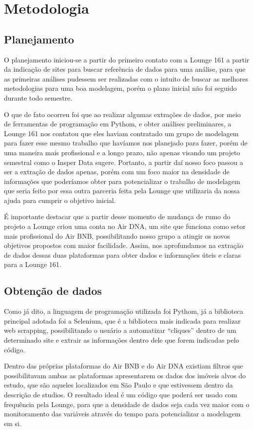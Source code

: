 \section*{Metodologia}
\subsection*{Planejamento} 
O planejamento iniciou-se a partir do primeiro contato com a Lounge 
161 a partir da indicação de sites para buscar referência de dados para uma 
análise, para que as primeiras análises pudessem ser realizadas com o intuito 
de buscar as melhores metodologias para uma boa modelagem, porém o 
plano inicial não foi seguido durante todo semestre. 

O que de fato ocorreu foi que ao realizar algumas extrações de dados, 
por meio de ferramentas de programação em Pythom, e obter análises 
preliminares, a Lounge 161 nos contatou que eles haviam contratado um 
grupo de modelagem para fazer esse mesmo trabalho que havíamos nos 
planejado para fazer, porém de uma maneira mais profissional e a longo 
prazo, não apenas visando um projeto semestral como o Insper Data sugere.
Portanto, a partir daí nosso foco passou a ser a extração de dados 
apenas, porém com um foco maior na densidade de informações que 
poderíamos obter para potencializar o trabalho de 
modelagem que seria feito por essa outra parceria feita 
pela Lounge que utilizaria da nossa ajuda para cumprir o 
objetivo inicial.

É importante destacar que a partir desse momento de mudança de 
rumo do projeto a Lounge criou uma conta no Air DNA, um site que funciona 
como setor mais profissional do Air BNB, possibilitando nosso grupo a atingir 
os novos objetivos propostos com maior facilidade. Assim, nos aprofundamos 
na extração de dados dessas duas plataformas para obter dados e 
informações úteis e claras para a Lounge 161.

\subsection*{Obtenção de dados}
Como já dito, a linguagem de programação utilizada foi Pythom, já a
biblioteca principal adotada foi a Selenium, que é a
biblioteca mais indicada para realizar web scrapping, 
possibilitando o usuário a automatizar “cliques” dentro 
de um determinado site e extrair as informações dentro dele que forem 
indicadas pelo código.

Dentro das próprias plataformas do Air BNB e do Air DNA existiam 
filtros que possibilitavam ambas as plataformas apresentarem os dados dos 
imóveis alvos do estudo, que são aqueles localizados em São Paulo e que 
estivessem dentro da descrição de studios. O resultado ideal é um código que 
poderá ser usado com frequência pela Lounge, para que a densidade de 
dados seja cada vez maior com o monitoramento das variáveis através do 
tempo para potencializar a modelagem em si.

